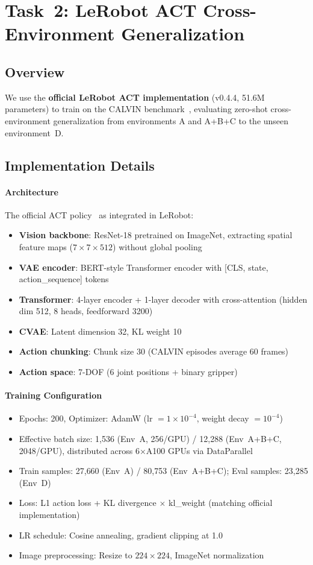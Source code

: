\documentclass[10pt,twocolumn,letterpaper]{article}
\begin{document}
\section{Task~2: LeRobot ACT Cross-Environment Generalization}

\subsection{Overview}

We use the \textbf{official LeRobot ACT implementation} (v0.4.4, 51.6M parameters) to train on the CALVIN benchmark~\cite{mees2022calvin}, evaluating zero-shot cross-environment generalization from environments A and A+B+C to the unseen environment~D.

\subsection{Implementation Details}

\paragraph{Architecture} The official ACT policy~\cite{zhao2023act} as integrated in LeRobot:
\begin{itemize}
\item \textbf{Vision backbone}: ResNet-18 pretrained on ImageNet, extracting spatial feature maps ($7 \times 7 \times 512$) without global pooling
\item \textbf{VAE encoder}: BERT-style Transformer encoder with [CLS, state, action\_sequence] tokens
\item \textbf{Transformer}: 4-layer encoder + 1-layer decoder with cross-attention (hidden dim 512, 8 heads, feedforward 3200)
\item \textbf{CVAE}: Latent dimension 32, KL weight 10
\item \textbf{Action chunking}: Chunk size 30 (CALVIN episodes average 60 frames)
\item \textbf{Action space}: 7-DOF (6 joint positions + binary gripper)
\end{itemize}

\paragraph{Training Configuration}
\begin{itemize}
\item Epochs: 200, Optimizer: AdamW (lr $= 1 \times 10^{-4}$, weight decay $= 10^{-4}$)
\item Effective batch size: 1{,}536 (Env~A, 256/GPU) / 12{,}288 (Env~A+B+C, 2048/GPU), distributed across 6$\times$A100 GPUs via DataParallel
\item Train samples: 27{,}660 (Env~A) / 80{,}753 (Env~A+B+C); Eval samples: 23{,}285 (Env~D)
\item Loss: L1 action loss + KL divergence $\times$ kl\_weight (matching official implementation)
\item LR schedule: Cosine annealing, gradient clipping at 1.0
\item Image preprocessing: Resize to $224 \times 224$, ImageNet normalization
\end{itemize}
\end{document}
